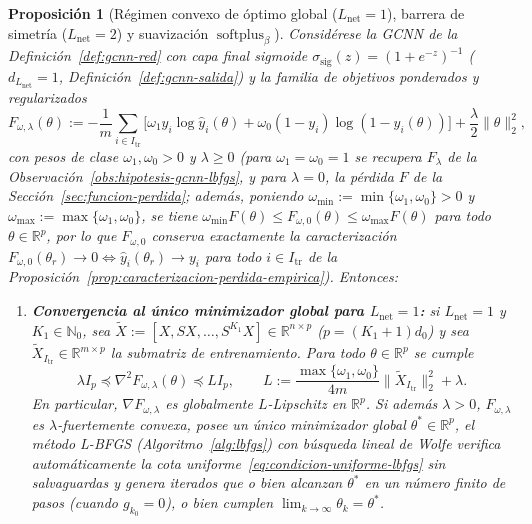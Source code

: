 \documentclass[a4paper,openany,oneside,10pt]{report}
\theoremstyle{pnlTeorema}
\newtheorem{proposicion}{Proposición}[section]
\theoremstyle{pnlDefinicion}
\theoremstyle{pnlObservacion}
\begin{document}
\begin{proposicion}[Régimen convexo de óptimo global ($L_{\mathrm{net}}=1$), barrera de simetría ($L_{\mathrm{net}}=2$) y suavización $\operatorname{softplus}_\beta$]
\label{prop:convexidad-una-capa-vs-simetria}
Considérese la GCNN de la Definición~\ref{def:gcnn-red} con capa final sigmoide $\sigma_{\mathrm{sig}}(z)=(1+e^{-z})^{-1}$ ($d_{L_{\mathrm{net}}}=1$, Definición~\ref{def:gcnn-salida}) y la familia de objetivos ponderados y regularizados
\begin{equation}\label{eq:objetivo-ponderado-l2}
F_{\omega,\lambda}(\theta)
:= -\frac{1}{m}\sum_{i\in I_{\mathrm{tr}}}
\bigl[\omega_1 y_i\log \hat y_i(\theta)+\omega_0(1-y_i)\log(1-\hat y_i(\theta))\bigr]
+\frac{\lambda}{2}\|\theta\|_2^2,
\end{equation}
con pesos de clase $\omega_1,\omega_0>0$ y $\lambda\ge 0$ (para $\omega_1=\omega_0=1$ se recupera $F_\lambda$ de la Observación~\ref{obs:hipotesis-gcnn-lbfgs}, y para $\lambda=0$, la pérdida $F$ de la Sección~\ref{sec:funcion-perdida}; además, poniendo $\omega_{\min}:=\min\{\omega_1,\omega_0\}>0$ y $\omega_{\max}:=\max\{\omega_1,\omega_0\}$, se tiene $\omega_{\min}F(\theta)\le F_{\omega,0}(\theta)\le\omega_{\max}F(\theta)$ para todo $\theta\in\mathbb{R}^p$, por lo que $F_{\omega,0}$ conserva exactamente la caracterización $F_{\omega,0}(\theta_r)\to 0\iff \hat y_i(\theta_r)\to y_i$ para todo $i\in I_{\mathrm{tr}}$ de la Proposición~\ref{prop:caracterizacion-perdida-empirica}). Entonces:
\begin{enumerate}
\item \textbf{Convergencia al único minimizador global para $L_{\mathrm{net}}=1$:} si $L_{\mathrm{net}}=1$ y $K_1\in\mathbb{N}_0$, sea $\widetilde{X}:=[X,SX,\ldots,S^{K_1}X]\in\mathbb{R}^{n\times p}$ ($p=(K_1+1)d_0$) y sea $\widetilde{X}_{I_{\mathrm{tr}}}\in\mathbb{R}^{m\times p}$ la submatriz de entrenamiento. Para todo $\theta\in\mathbb{R}^p$ se cumple
\[
\lambda I_p \preceq \nabla^2 F_{\omega,\lambda}(\theta) \preceq L I_p,
\qquad
L := \frac{\max\{\omega_1,\omega_0\}}{4m}\|\widetilde{X}_{I_{\mathrm{tr}}}\|_2^2 + \lambda.
\]
En particular, $\nabla F_{\omega,\lambda}$ es globalmente $L$-Lipschitz en $\mathbb{R}^p$. Si además $\lambda>0$, $F_{\omega,\lambda}$ es $\lambda$-fuertemente convexa, posee un único minimizador global $\theta^*\in\mathbb{R}^p$, el método L-BFGS (Algoritmo~\ref{alg:lbfgs}) con búsqueda lineal de Wolfe verifica automáticamente la cota uniforme~\eqref{eq:condicion-uniforme-lbfgs} sin salvaguardas y genera iterados que o bien alcanzan $\theta^*$ en un número finito de pasos (cuando $g_{k_0}=0$), o bien cumplen $\lim_{k\to\infty}\theta_k=\theta^*$.

\end{enumerate}
\end{proposicion}
\end{document}
